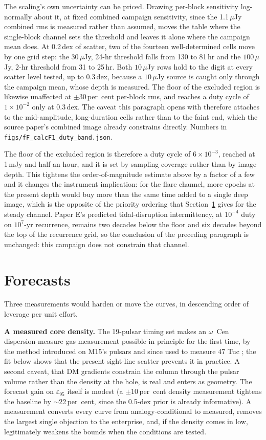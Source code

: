 \documentclass[11pt]{article}
\newcommand{\ocen}{$\omega$~Cen}
\newcommand{\epsl}{\ensuremath{\varepsilon_{95}}}
\begin{document}
The scaling's own uncertainty can be priced. Drawing per-block sensitivity
log-normally about it, at fixed combined campaign sensitivity, since the
1.1\,$\mu$Jy combined rms is measured rather than assumed, moves the table
where the single-block channel sets the threshold and leaves it alone where
the campaign mean does. At 0.2\,dex of scatter, two of the fourteen
well-determined cells move by one grid step: the $30\,\mu$Jy, 24-hr threshold
falls from 130 to 81\,hr and the $100\,\mu$Jy, 2-hr threshold from 31 to 25\,hr.
Both $10\,\mu$Jy rows hold to the digit at every scatter level tested, up to
0.3\,dex, because a $10\,\mu$Jy source is caught only through the campaign mean,
whose depth is measured. The floor of the excluded region is likewise
unaffected at $\pm$30\,per~cent per-block rms, and reaches a duty cycle of
$1\times10^{-2}$ only at 0.3\,dex. The caveat this paragraph opens with
therefore attaches to the mid-amplitude, long-duration cells rather than to the
faint end, which the source paper's combined image already constrains directly.
Numbers in \texttt{figs/fF\_calcF1\_duty\_band.json}.

The floor of the excluded region is therefore a duty cycle of $6\times10^{-3}$, reached at 1\,mJy and half an hour, and it is set by sampling coverage rather than by image depth. This tightens the order-of-magnitude estimate above by a factor of a few and it changes the instrument implication: for the flare channel, more epochs at the present depth would buy more than the same time added to a single deep image, which is the opposite of the priority ordering that Section~\ref{sec:forecast} gives for the steady channel. Paper E's predicted tidal-disruption intermittency, at $10^{-4}$ duty on $10^{7}$-yr recurrence, remains two decades below the floor and six decades beyond the top of the recurrence grid, so the conclusion of the preceding paragraph is unchanged: this campaign does not constrain that channel.

\section{Forecasts}
\label{sec:forecast}

Three measurements would harden or move the curves, in descending order of leverage per unit effort.

\textbf{A measured core density.} The 19-pulsar timing set \citep{ColomiBernadich2026} makes an \ocen{} dispersion-measure gas measurement possible in principle for the first time, by the method introduced on M15's pulsars \citep{AndersonSB1993} and since used to measure 47 Tuc \citep{Freire2001,Abbate2018}; the fit below shows that the present sight-line scatter prevents it in practice. A second caveat, that DM gradients constrain the column through the pulsar volume rather than the density at the hole, is real and enters as geometry. The forecast gain on \epsl{} itself is modest (a $\pm$10\,per~cent density measurement tightens the baseline by $\sim$22\,per~cent, since the 0.5-dex prior is already informative). A measurement converts every curve from analogy-conditional to measured, removes the largest single objection to the enterprise, and, if the density comes in low, legitimately weakens the bounds when the conditions are tested.
\end{document}
